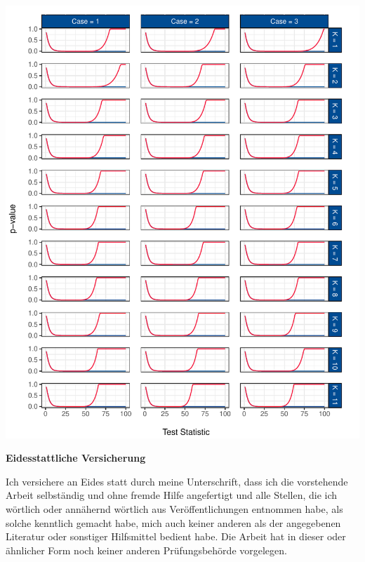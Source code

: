 \documentclass[12pt,a4paper]{article}
\let\origfigure\figure
\let\endorigfigure\endfigure
\renewenvironment{figure}[1][2] {
    \expandafter\origfigure\expandafter[H]
} {
    \endorigfigure
}
\begin{document}
\begin{figure}
\centering
\includegraphics{p_approx_paper_files/figure-latex/p_stat_e_j-1.pdf}
\caption{\label{fig:fig_4} Corrected (blue) and uncorrected (red)
\(p\)-value predictions for all cases using Engle-Granger and Johansen
as underlying tests.}
\end{figure}

\restoregeometry

\cleardoublepage
\newpage
\renewcommand*{\mkbibnamefamily}[1]{\textbf{#1}}
\renewcommand*{\mkbibnamegiven}[1]{\textbf{#1}}
\renewcommand*{\mkbibnameprefix}[1]{\textbf{#1}}
\renewcommand*{\mkbibnamesuffix}[1]{\textbf{#1}}




\newpage
\textbf{Eidesstattliche Versicherung}

\bigskip

Ich versichere an Eides statt durch meine Unterschrift, dass ich die vorstehende Arbeit selbständig und ohne fremde Hilfe angefertigt und alle Stellen, die ich wörtlich oder annähernd wörtlich aus Veröffentlichungen entnommen habe, als solche kenntlich gemacht habe, mich auch keiner anderen als der angegebenen Literatur oder sonstiger Hilfsmittel bedient habe. Die Arbeit hat in dieser oder ähnlicher Form noch keiner anderen Prüfungsbehörde vorgelegen.

\vspace{1cm}
\rule{0pt}{2\baselineskip} %
\par\noindent{} \hfill\makebox[2.25in]{\hrulefill}%
\par\noindent\makebox[2.25in][l]{} \hfill{}%
\end{document}
